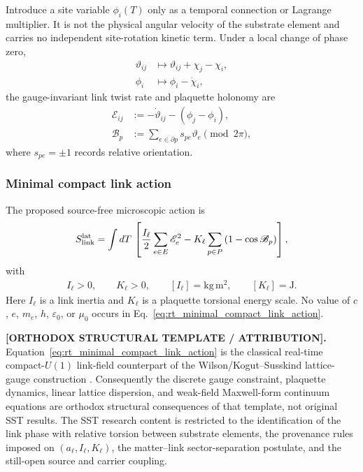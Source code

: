 Introduce a site variable $\phi_i(T)$ only as a temporal connection or Lagrange
multiplier.  It is not the physical angular velocity of the substrate element and
carries no independent site-rotation kinetic term.  Under a local change of
phase zero,
\begin{align}
    \vartheta_{ij}
    &\mapsto
    \vartheta_{ij}+\chi_j-\chi_i,
    \\
    \phi_i
    &\mapsto
    \phi_i-\dot\chi_i,
    \label{eq:rt_link_gauge_transformation}
\end{align}
the gauge-invariant link twist rate and plaquette holonomy are
\begin{align}
    \mathscr E_{ij}
    &:=-\dot\vartheta_{ij}-(\phi_j-\phi_i),
    \label{eq:rt_link_electric_variable}
    \\
    \mathscr B_p
    &:={\sum}_{e\in\partial p}s_{pe}\vartheta_e
    \pmod{2\pi},
    \label{eq:rt_link_plaquette_holonomy}
\end{align}
where $s_{pe}=\pm1$ records relative orientation.

\subsubsection{Minimal compact link action}

The proposed source-free microscopic action is
\begin{align}
    S_{\rm link}^{\rm lat}
    =
    \int dT\,
    \left[
        \frac{I_\ell}{2}
        \sum_{e\in E}\mathscr E_e^2
        -
        K_\ell
        \sum_{p\in P}
        \left(1-\cos\mathscr B_p\right)
    \right],
    \label{eq:rt_minimal_compact_link_action}
\end{align}
with
\begin{align}
    I_\ell>0,
    \qquad
    K_\ell>0,
    \qquad
    [I_\ell]=\mathrm{kg\,m^2},
    \qquad
    [K_\ell]=\mathrm{J}.
    \label{eq:rt_link_parameter_dimensions}
\end{align}
Here $I_\ell$ is a link inertia and $K_\ell$ is a plaquette torsional energy
scale.  No value of $c$, $e$, $m_e$, $h$, $\varepsilon_0$, or $\mu_0$ occurs in
Eq.~\eqref{eq:rt_minimal_compact_link_action}.

\textbf{[ORTHODOX STRUCTURAL TEMPLATE / ATTRIBUTION].}
Equation~\eqref{eq:rt_minimal_compact_link_action} is the classical real-time
compact-\(U(1)\) link-field counterpart of the Wilson/Kogut--Susskind lattice-
gauge construction \cite{Wilson1974,KogutSusskind1975,Kogut1979}.  Consequently
the discrete gauge constraint, plaquette dynamics, linear lattice dispersion,
and weak-field Maxwell-form continuum equations are orthodox structural
consequences of that template, not original SST results.  The SST research
content is restricted to the identification of the link phase with relative
torsion between substrate elements, the provenance rules imposed on
\((a_\ell,I_\ell,K_\ell)\), the matter--link sector-separation postulate, and the
still-open source and carrier coupling.

